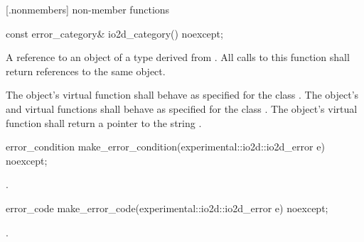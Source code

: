  [\iotwoderrorcategory.nonmembers] { 
non-member functions}

\begin{itemdecl}
  const error_category& io2d_category() noexcept;
\end{itemdecl}
\begin{itemdescr}
	\pnum
	\returns
	A reference to an object of a type derived from . All 
	calls to this function shall return references to the same object.
	
	\pnum
	\remarks
	The object's  virtual function shall behave 
	as specified for the class . The object's 
	 and  
	virtual functions shall behave as specified for the class 
	. The object's  virtual function 
	shall return a pointer to the string .
\end{itemdescr}

\begin{itemdecl}
error_condition make_error_condition(experimental::io2d::io2d_error e) noexcept;
\end{itemdecl}
\begin{itemdescr}
\pnum
\returns
{}.
\end{itemdescr}

\begin{itemdecl}
error_code make_error_code(experimental::io2d::io2d_error e) noexcept;
\end{itemdecl}
\begin{itemdescr}
\pnum
\returns
{}.
\end{itemdescr}
